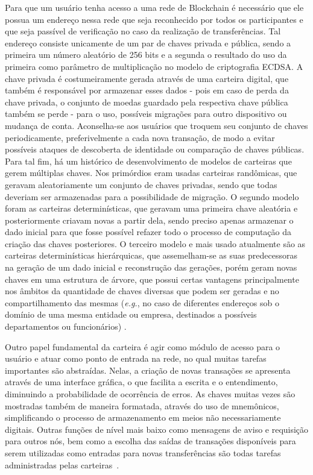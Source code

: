 Para que um usuário tenha acesso a uma rede  de Blockchain é necessário que ele possua um endereço nessa rede que seja reconhecido por todos os participantes e que seja passível de verificação no caso da realização de transferências. Tal endereço consiste unicamente de um par de chaves privada e pública, sendo a primeira um número aleatório de 256 bits e a segunda o resultado do uso da primeira como parâmetro de multiplicação no modelo de criptografia \ac{ECDSA}. A chave privada é costumeiramente gerada através de uma carteira digital, que também é responsável por armazenar esses dados - pois em caso de perda da chave privada, o conjunto de moedas guardado pela respectiva chave pública também se perde - para o uso, possíveis migrações para outro dispositivo ou mudança de conta. Aconselha-se aos usuários que troquem seu conjunto de chaves periodicamente, preferivelmente a cada nova transação, de modo a evitar possíveis ataques de descoberta de identidade ou comparação de chaves públicas. Para tal fim, há um histórico de desenvolvimento de modelos de carteiras que gerem múltiplas chaves. Nos primórdios eram usadas carteiras randômicas, que geravam aleatoriamente um conjunto de chaves privadas, sendo que todas deveriam ser armazenadas para a possibilidade de migração. O segundo modelo foram as carteiras determinísticas, que geravam uma primeira chave aleatória e posteriormente criavam novas a partir dela, sendo preciso apenas armazenar o dado inicial para que fosse possível refazer todo o processo de computação da criação das chaves posteriores. O terceiro modelo e mais usado atualmente são as carteiras determinísticas hierárquicas, que assemelham-se as suas predecessoras na geração de um dado inicial e reconstrução das gerações, porém geram novas chaves em uma estrutura de árvore, que possui certas vantagens principalmente nos âmbitos da quantidade de chaves diversas que podem ser geradas e no compartilhamento das mesmas (\textit{e.g.}, no caso de diferentes endereços sob o domínio de uma mesma entidade ou empresa, destinados a possíveis departamentos ou funcionários) \cite{blockchain:documentacao_bitcoin}.

%
Outro papel fundamental da carteira é agir como módulo de acesso para o usuário e atuar como ponto de entrada na rede, no qual muitas tarefas importantes são abstraídas. Nelas, a criação de novas transações se apresenta através de uma interface gráfica, o que facilita a escrita e o entendimento, diminuindo a probabilidade de ocorrência de erros. As chaves muitas vezes são mostradas também de maneira formatada, através do uso de mnemônicos, simplificando o processo de armazenamento em meios não necessariamente digitais. Outras funções de nível mais baixo como mensagens de aviso e requisição para outros nós, bem como a escolha das saídas de transações disponíveis para serem utilizadas como entradas para novas transferências são todas tarefas administradas pelas carteiras~\cite{blockchain:mastering_bitcoin}.

